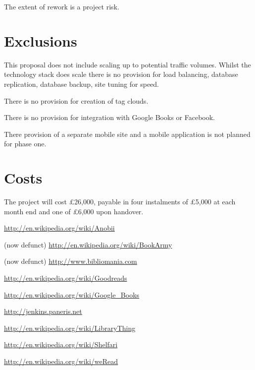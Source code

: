 \documentclass [12pt, a4paper, twoside, titlepage] {article}
\begin{document}
The extent of rework is a project risk.


\section{Exclusions}
This proposal does not include scaling up to potential traffic volumes. 
Whilst the technology stack does scale there is no provision for load balancing, database replication, database backup, site tuning for speed.


There is no provision for creation of tag clouds. 

There is no provision for integration with Google Books or Facebook.

There provision of a separate mobile site and a mobile application is not planned for phase one. 

\section{Costs}
The project will cost \pounds26,000, payable in four instalments of  \pounds5,000 at each month end and one of \pounds6,000 upon handover. 

\newpage

\begin{thebibliography}{scribe}

\url{http://en.wikipedia.org/wiki/Anobii}


 (now defunct)
\url{http://en.wikipedia.org/wiki/BookArmy}

 (now defunct)
\url{http://www.bibliomania.com}


\url{http://en.wikipedia.org/wiki/Goodreads}

\url{http://en.wikipedia.org/wiki/Google_Books}

\url{http://jenkins.paneris.net}

\url{http://en.wikipedia.org/wiki/LibraryThing}


\url{http://en.wikipedia.org/wiki/Shelfari}


\url{http://en.wikipedia.org/wiki/weRead}


\end{thebibliography}
\end{document}
